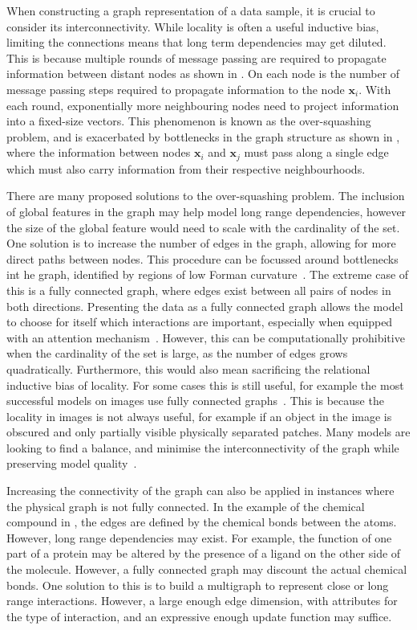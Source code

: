 When constructing a graph representation of a data sample, it is crucial to consider its interconnectivity.
While locality is often a useful inductive bias, limiting the connections means that long term dependencies may get diluted.
This is because multiple rounds of message passing are required to propagate information between distant nodes as shown in .
On each node is the number of message passing steps required to propagate information to the node $\mathbf{x}_i$.
With each round, exponentially more neighbouring nodes need to project information into a fixed-size vectors.
This phenomenon is known as the over-squashing problem, and is exacerbated by bottlenecks in the graph structure as shown in , where the information between nodes $\mathbf{x}_i$ and $\mathbf{x}_j$ must pass along a single edge which must also carry information from their respective neighbourhoods.

There are many proposed solutions to the over-squashing problem.
The inclusion of global features in the graph may help model long range dependencies, however the size of the global feature would need to scale with the cardinality of the set.
One solution is to increase the number of edges in the graph, allowing for more direct paths between nodes.
This procedure can be focussed around bottlenecks int he graph, identified by regions of low Forman curvature~.
The extreme case of this is a fully connected graph, where edges exist between all pairs of nodes in both directions.
Presenting the data as a fully connected graph allows the model to choose for itself which interactions are important, especially when equipped with an attention mechanism~.
However, this can be computationally prohibitive when the cardinality of the set is large, as the number of edges grows quadratically.
Furthermore, this would also mean sacrificing the relational inductive bias of locality.
For some cases this is still useful, for example the most successful models on images use fully connected graphs~.
This is because the locality in images is not always useful, for example if an object in the image is obscured and only partially visible physically separated patches.
Many models are looking to find a balance, and minimise the interconnectivity of the graph while preserving model quality~.

Increasing the connectivity of the graph can also be applied in instances where the physical graph is not fully connected.
In the example of the chemical compound in , the edges are defined by the chemical bonds between the atoms.
However, long range dependencies may exist.
For example, the function of one part of a protein may be altered by the presence of a ligand on the other side of the molecule.
However, a fully connected graph may discount the actual chemical bonds.
One solution to this is to build a multigraph to represent close or long range interactions.
However, a large enough edge dimension, with attributes for the type of interaction, and an expressive enough update function may suffice.

